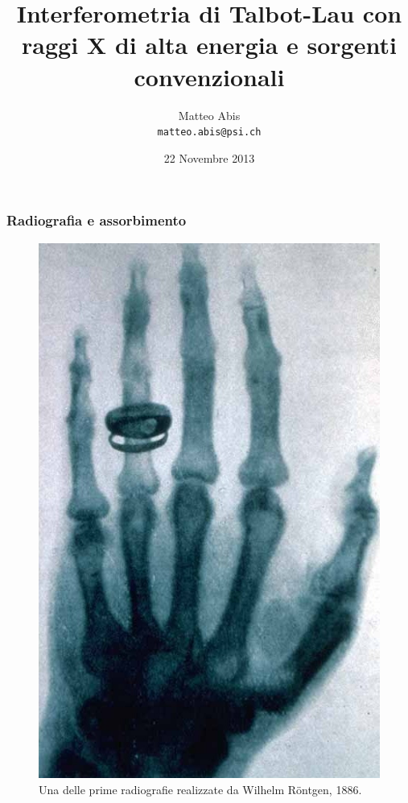 \documentclass[italian]{beamer}
\title[Interferometria di Talbot-Lau]{Interferometria di Talbot-Lau con
raggi X di alta energia e sorgenti convenzionali}
\author{Matteo Abis\\
\texttt{matteo.abis@psi.ch}}
\institute{Scuola Galileiana di Studi Superiori\\
Classe di Scienze Naturali}
\date{22 Novembre 2013}
\begin{document}
\begingroup
\begin{frame}
  \titlepage
\end{frame}
\endgroup
 
\begin{frame}
    \frametitle{Radiografia e assorbimento}
    \begin{figure}[h!]
        \centering
        \includegraphics[height=.7\textheight]{roentgen.jpg}
        \caption{Una delle prime radiografie realizzate da Wilhelm
        R\"ontgen, 1886.}
    \end{figure}
\end{frame}
\end{document}
